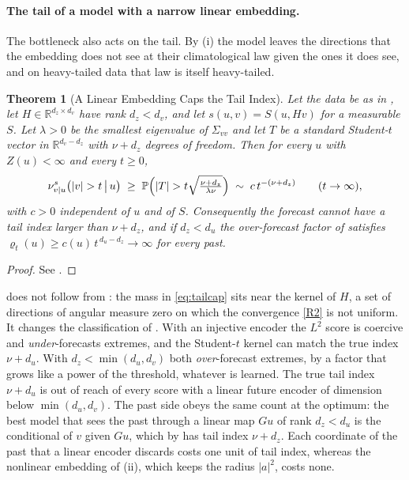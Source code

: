 \documentclass[11pt]{article}
\theoremstyle{plain}
\newtheorem{theorem}{Theorem}[section]
\theoremstyle{definition}
\theoremstyle{remark}
\newcommand{\RR}{\mathbb{R}}
\newcommand{\abs}[1]{\left\lvert #1 \right\rvert}
\begin{document}
\paragraph{The tail of a model with a narrow linear embedding.}
The bottleneck also acts on the tail. By (i) the model
leaves the directions that the embedding does not see at their climatological
law given the ones it does see, and on heavy-tailed data that law is itself
heavy-tailed.

\begin{theorem}[A Linear Embedding Caps the Tail Index]
 \label{thm:tailcap}
 Let the data be as in , let
 $H\in\RR^{d_z\times d_v}$ have rank $d_z<d_v$, and let $s(u,v)=S(u,Hv)$ for
 a measurable $S$. Let $\lambda>0$ be the smallest eigenvalue of
 $\Sigma_{vv}$ and let $T$ be a standard Student-$t$ vector in
 $\RR^{d_v-d_z}$ with $\nu+d_z$ degrees of freedom. Then for every $u$ with
 $Z(u)<\infty$ and every $t\ge0$,
 \begin{equation}
  \nu^{s}_{v\vert u}\bigl(\abs{v}>t\,\big\vert\,u\bigr)\;\ge\;
  \mathbb{P}\Bigl(\abs{T}>t\sqrt{\tfrac{\nu+d_z}{\lambda\nu}}\Bigr)\;\sim\;c\,t^{-(\nu+d_z)}
  \qquad(t\to\infty),
  \label{eq:tailcap}
 \end{equation}
 with $c>0$ independent of $u$ and of $S$. Consequently the forecast cannot
 have a tail index larger than $\nu+d_z$, and if $d_z<d_u$ the over-forecast
 factor of  satisfies
 $\varrho_t(u)\ge c(u)\,t^{\,d_u-d_z}\to\infty$ for every past.
\end{theorem}
\begin{proof}
 See .
\end{proof}

 does not follow from : the mass in
\eqref{eq:tailcap} sits near the kernel of $H$, a set of directions of
angular measure zero on which the convergence \ref{R2} is not uniform. It
changes the classification of . With an injective
encoder the $L^2$ score is coercive and \emph{under}-forecasts extremes, and
the Student-$t$ kernel can match the true index $\nu+d_u$. With
$d_z<\min(d_u,d_v)$ both \emph{over}-forecast extremes, by a factor that
grows like a power of the threshold, whatever is learned. The true tail index
$\nu+d_u$ is out of reach of every score with a linear future encoder of
dimension below $\min(d_u,d_v)$. The past side obeys the same count at the
optimum: the best model that sees the past through a linear map $Gu$ of rank
$d_z<d_u$ is the conditional of $v$ given $Gu$, which by 
has tail index $\nu+d_z$. Each coordinate of the past that a linear encoder
discards costs one unit of tail index, whereas the nonlinear embedding of
(ii), which keeps the radius $\abs{a}^{2}$, costs none.
\end{document}
